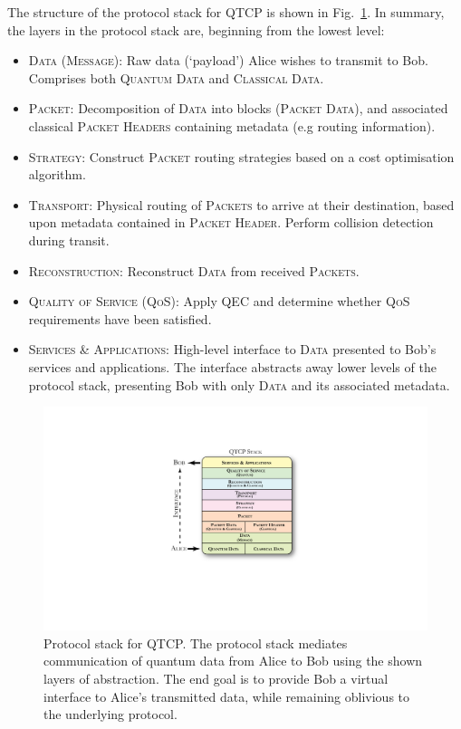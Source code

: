 \documentclass[aps, rmp, twocolumn, amsmath, amssymb, nofootinbib, superscriptaddress, longbibliography, floatfix, table-of-contents, eqsecnum]{revtex4-1}
\begin{document}
The structure of the protocol stack for QTCP is shown in Fig.~\ref{fig:stack}. In summary, the layers in the protocol stack are, beginning from the lowest level:
\begin{itemize}
\item \textsc{Data (Message)}: Raw data (`payload') Alice wishes to transmit to Bob. Comprises both \textsc{Quantum Data} and \textsc{Classical Data}.
\item \textsc{Packet}: Decomposition of \textsc{Data} into blocks (\textsc{Packet Data}), and associated classical \textsc{Packet Headers} containing metadata (e.g routing information).
\item \textsc{Strategy}: Construct \textsc{Packet} routing strategies based on a cost optimisation algorithm.
\item \textsc{Transport}: Physical routing of \textsc{Packets} to arrive at their destination, based upon metadata contained in \textsc{Packet Header}. Perform collision detection during transit.
\item \textsc{Reconstruction}: Reconstruct \textsc{Data} from received \textsc{Packets}.
\item \textsc{Quality of Service (QoS)}: Apply QEC and determine whether \textsc{QoS} requirements have been satisfied.
\item \textsc{Services \& Applications}: High-level interface to \textsc{Data} presented to Bob's services and applications. The interface abstracts away lower levels of the protocol stack, presenting Bob with only \textsc{Data} and its associated metadata.
\end{itemize}

\begin{figure}[!htb]
\includegraphics[width=\columnwidth]{stack}
\caption{Protocol stack for QTCP. The protocol stack mediates communication of quantum data from Alice to Bob using the shown layers of abstraction. The end goal is to provide Bob a virtual interface to Alice's transmitted data, while remaining oblivious to the underlying protocol.} \label{fig:stack}
\end{figure}
\end{document}

